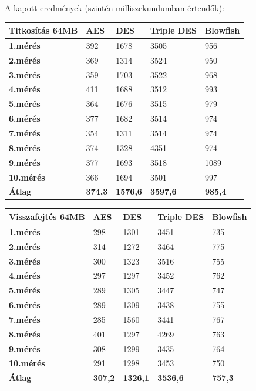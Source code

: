 \newpage
A kapott eredmények (szintén milliszekundumban értendők):
\begin{center}
	\begin{tabular}{|p{2.4cm}|p{2cm}|p{2cm}|p{2cm}|p{2cm}|}
		\hline
		\textbf{Titkosítás} \newline \textbf{64MB} & \textbf{AES} & \textbf{DES} & \textbf{Triple DES} & \textbf{Blowfish}\\
		\hline
		\textbf{1.mérés} & 392 & 1678 & 3505 & 956\\
		\hline
		\textbf{2.mérés} & 369 & 1314 & 3524 & 950\\
		\hline
		\textbf{3.mérés} & 359 & 1703 & 3522 & 968\\
		\hline
		\textbf{4.mérés} & 411 & 1688 & 3512 & 993\\
		\hline
		\textbf{5.mérés} & 364 & 1676 & 3515 & 979\\
		\hline
		\textbf{6.mérés} & 377 & 1682 & 3514 & 974\\
		\hline
		\textbf{7.mérés} & 354 & 1311 & 3514 & 974\\
		\hline
		\textbf{8.mérés} & 374 & 1328 & 4351 & 974\\
		\hline
		\textbf{9.mérés} & 377 & 1693 & 3518 & 1089\\
		\hline
		\textbf{10.mérés} & 366 & 1694 & 3501 & 997\\
		\hline
		\hline
		\textbf{Átlag} & \textbf{374,3} & \textbf{1576,6} & \textbf{3597,6} & \textbf{985,4}\\
		\hline
	\end{tabular}
\end{center}

\begin{center}
	\begin{tabular}{|p{2.4cm}|p{2cm}|p{2cm}|p{2cm}|p{2cm}|}
		\hline
		\textbf{Visszafejtés} \newline \textbf{64MB} & \textbf{AES} & \textbf{DES} & \textbf{Triple DES} & \textbf{Blowfish}\\
		\hline
		\textbf{1.mérés} & 298 & 1301 & 3451 & 735\\
		\hline
		\textbf{2.mérés} & 314 & 1272 & 3464 & 775\\
		\hline
		\textbf{3.mérés} & 300 & 1323 & 3516 & 755\\
		\hline
		\textbf{4.mérés} & 297 & 1297 & 3452 & 762\\
		\hline
		\textbf{5.mérés} & 289 & 1305 & 3447 & 747\\
		\hline
		\textbf{6.mérés} & 289 & 1309 & 3438 & 755\\
		\hline
		\textbf{7.mérés} & 285 & 1560 & 3441 & 767\\
		\hline
		\textbf{8.mérés} & 401 & 1297 & 4269 & 763\\
		\hline
		\textbf{9.mérés} & 308 & 1299 & 3435 & 764\\
		\hline
		\textbf{10.mérés} & 291 & 1298 & 3453 & 750\\
		\hline
		\hline
		\textbf{Átlag} & \textbf{307,2} & \textbf{1326,1} & \textbf{3536,6} & \textbf{757,3}\\
		\hline
	\end{tabular}
\end{center}


